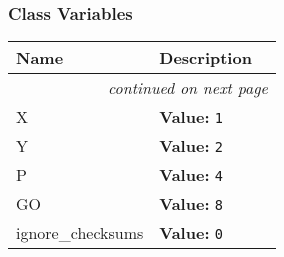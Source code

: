 
  \subsubsection{Class Variables}

\begin{longtable}{|p{}|p{}|l}
\cline{1-2}
\cline{1-2} \centering \textbf{Name} & \centering \textbf{Description}& \\
\cline{1-2}
\endhead\cline{1-2}\multicolumn{3}{r}{\small\textit{continued on next page}}\\\endfoot\cline{1-2}
\endlastfoot\raggedright X\- & \textbf{Value:} 
{\tt 1\-}&\\
\cline{1-2}
\raggedright Y\- & \textbf{Value:} 
{\tt 2\-}&\\
\cline{1-2}
\raggedright P\- & \textbf{Value:} 
{\tt 4\-}&\\
\cline{1-2}
\raggedright G\-O\- & \textbf{Value:} 
{\tt 8\-}&\\
\cline{1-2}
\raggedright i\-g\-n\-o\-r\-e\-\_\-c\-h\-e\-c\-k\-s\-u\-m\-s\- & \textbf{Value:} 
{\tt 0\-}&\\
\cline{1-2}
\end{longtable}

